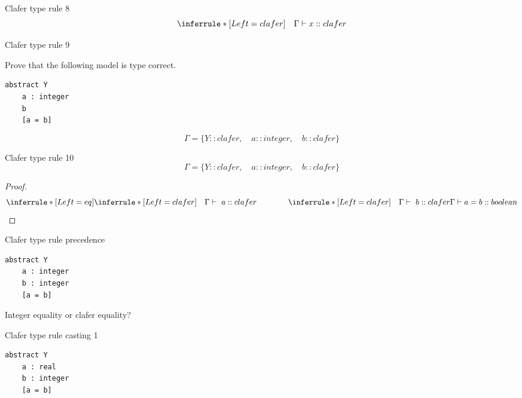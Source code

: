 \documentclass[table,15pt,t]{beamer}
\begin{document}
\begin{frame}[fragile,c]{Clafer type rule 8}
\begin{equation*}
\inferrule* [Left=clafer] {\quad}{\Gamma\vdash x::clafer}
\end{equation*}
\end{frame}

\begin{frame}[fragile,c]{Clafer type rule 9}

 Prove that the following model is type correct.

\begin{lstlisting}
abstract Y
    a : integer
    b
    [a = b]
\end{lstlisting}

\begin{equation*}
\Gamma = \{Y::clafer,\quad a::integer,\quad b::clafer\}
\end{equation*}
\end{frame}

\begin{frame}[fragile,c]{Clafer type rule 10}
\begin{equation*}
\Gamma = \{Y::clafer,\quad a::integer,\quad b::clafer\}
\end{equation*}

\begin{proof}
\begin{equation*}
\inferrule* [Left=eq] {
  \inferrule* [Left=clafer]{\quad}{\Gamma\vdash\ a::clafer} \\ \hspace{40pt} 
  \inferrule* [Left=clafer]{\quad}{\Gamma\vdash\ b::clafer}}
{\Gamma\vdash a = b::boolean}
\end{equation*}
\end{proof}
\end{frame}

\begin{frame}[fragile,c]{Clafer type rule precedence}
\begin{lstlisting}
abstract Y
    a : integer
    b : integer
    [a = b]
\end{lstlisting}

\vfill Integer equality or clafer equality?
\end{frame}

\begin{frame}[fragile,c]{Clafer type rule casting 1}
\begin{lstlisting}
abstract Y
    a : real
    b : integer
    [a = b]
\end{lstlisting}
\end{frame}
\end{document}
